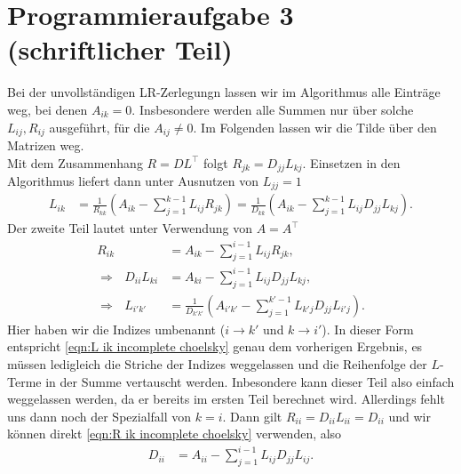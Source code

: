 \documentclass[english, parskip=full]{scrartcl}
\newcommand{\kla}{}
\begin{document}


\section*{Programmieraufgabe 3 (schriftlicher Teil)}
Bei der unvollständigen LR-Zerlegungn lassen wir im Algorithmus alle Einträge weg, bei denen $A_{ik} = 0$.
Insbesondere werden alle Summen nur über solche $L_{ij},R_{ij}$ ausgeführt, für die $A_{ij}\neq 0$.
Im Folgenden lassen wir die Tilde über den Matrizen weg.
\\
Mit dem Zusammenhang $R=DL^\top$ folgt $R_{jk} = D_{jj}L_{kj}$.
Einsetzen in den Algorithmus liefert dann unter Ausnutzen von $L_{jj}=1$
\begin{align}
L_{ik} &= \frac{1}{R_{kk}} \kla\left( A_{ik} - \sum_{j=1}^{k-1}L_{ij}R_{jk} \right) = \frac{1}{D_{kk}} \kla\left( A_{ik} - \sum_{j=1}^{k-1}L_{ij}D_{jj}L_{kj} \right).
\end{align}
Der zweite Teil lautet unter Verwendung von $A=A^\top$
\begin{align}
R_{ik} &= A_{ik} - \sum_{j=1}^{i-1} L_{ij}R_{jk},\\
\Rightarrow\ \ \ D_{ii}L_{ki} &= A_{ki} - \sum_{j=1}^{i-1} L_{ij}D_{jj}L_{kj}, \label{eqn:R ik incomplete choelsky} \\
\Rightarrow\ \ \ L_{i'k'} &= \frac{1}{D_{k'k'}} \kla\left( A_{i'k'} - \sum_{j=1}^{k'-1} L_{k'j}D_{jj}L_{i'j} \right). \label{eqn:L ik incomplete choelsky} 
\end{align} 
Hier haben wir die Indizes umbenannt ($i\rightarrow k'$ und $k\rightarrow i'$).
In dieser Form entspricht \autoref{eqn:L ik incomplete choelsky} genau dem vorherigen Ergebnis, es müssen ledigleich die Striche der Indizes weggelassen und die Reihenfolge der $L$-Terme in der Summe vertauscht werden.
Inbesondere kann dieser Teil also einfach weggelassen werden, da er bereits im ersten Teil berechnet wird.
Allerdings fehlt uns dann noch der Spezialfall von $k=i$.
Dann gilt $R_{ii} = D_{ii}L_{ii} = D_{ii}$ und wir können direkt \autoref{eqn:R ik incomplete choelsky} verwenden, also
\begin{align}
D_{ii} &= A_{ii} - \sum_{j=1}^{i-1}L_{ij}D_{jj}L_{ij}.
\end{align}

\end{document}
